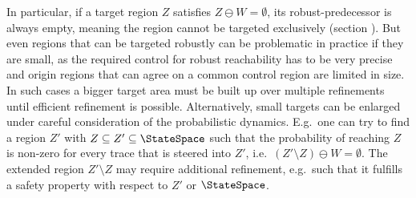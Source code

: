     In particular, if a target region $Z$ satisfies $Z \ominus W = \emptyset$, its robust-predecessor is always empty, meaning the region cannot be targeted exclusively (section ).
    But even regions that can be targeted robustly can be problematic in practice if they are small, as the required control for robust reachability has to be very precise and origin regions that can agree on a common control region are limited in size.
    In such cases a bigger target area must be built up over multiple refinements until efficient refinement is possible.
    Alternatively, small targets can be enlarged under careful consideration of the probabilistic dynamics.
    E.g.\ one can try to find a region $Z'$ with $Z \subseteq Z' \subseteq \StateSpace$ such that the probability of reaching $Z$ is non-zero for every trace that is steered into $Z'$, i.e.\ $(Z' \setminus Z) \ominus W = \emptyset$.
    The extended region $Z' \setminus Z$ may require additional refinement, e.g.\ such that it fulfills a safety property with respect to $Z'$ or $\StateSpace$.

\stopsubsection

